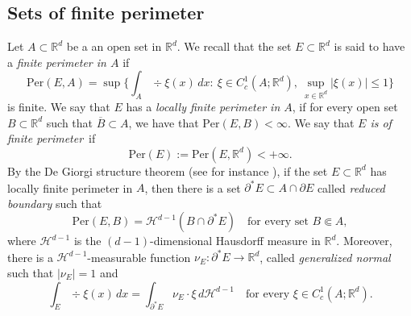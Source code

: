 \documentclass[11pt]{article}
\numberwithin{equation}{section}
\newcommand{\Per}{\mathrm{Per}}
\theoremstyle{plain}
\theoremstyle{definition}
\def\R{\mathbb{R}}
\def\HH{\mathcal{H}}
\begin{document}
\subsection{Sets of finite perimeter}\label{sub:perimeter}
Let $A\subset\R^d$ be a an open set in $\R^d$. We recall that the set $E\subset\R^d$ is said to have a {\it finite perimeter in $A$} if\enlargethispage{.5\baselineskip}%
\begin{equation}\label{e:per}\Per(E,A)=\sup\Big\{\int_{A}\div\xi(x)\,dx:\ \xi\in C^1_c(A;\R^d),\ \sup_{x\in \R^d}|\xi (x)|\le 1\Big\}
\end{equation}
is finite. We say that $E$ has a {\it locally finite perimeter in $A$}, if for every open set $B\subset \R^d$ such that $\overline B\subset A$, we have that $\Per(E,B)<\infty$. We say that {\it $E$ is of finite perimeter}~if\vspace*{-3pt}
\[\Per(E):=\Per(E,\R^d)<+\infty.\]
By the De Giorgi structure theorem (see for instance \cite[Th.\,II.4.9]{maggi}), if the set $E\subset \R^d$ has locally finite perimeter in $A$, then there is a set $\partial^\ast E\subset A\cap \partial E$ called {\it reduced boundary} such that
\[\Per(E,B)=\HH^{d-1}(B\cap\partial^\ast E)\quad\text{for every set } B\Subset A,\]
where $\HH^{d-1}$ is the $(d-1)$-dimensional Hausdorff measure in $\R^d$.
Moreover, there is a $\HH^{d-1}$-measurable function $\nu_E:\partial^\ast E\to\R^d$, called {\it generalized normal} such that $|\nu_E|=1$ and\vspace*{-3pt}
\[\int_E\div\xi(x)\,dx=\int_{\partial^\ast E}\nu_E\cdot \xi\,d\HH^{d-1}\quad\text{for every } \xi\in C^1_c(A;\R^d).\]
\end{document}

